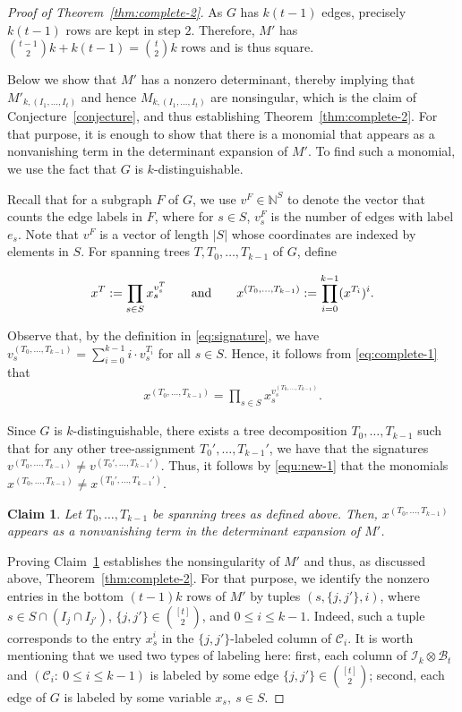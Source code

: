 \documentclass[11pt]{article}
\newtheorem{claim}[theorem]{Claim}
\begin{document}
\begin{proof}[Proof of Theorem~\ref{thm:complete-2}]
\noindent As $G$ has $k(t-1)$ edges, precisely $k(t-1)$ rows are kept in step $2$. Therefore, $M'$ has $\binom{t-1}{2}k + k(t-1) = \binom{t}{2}k$ rows and is thus square.

Below we show that $M'$ has a nonzero determinant, thereby implying that $M'_{k,(I_1,\ldots,I_t)}$ and hence $M_{k,(I_1,\ldots,I_t)}$ are nonsingular, which is the claim of Conjecture~\ref{conjecture}, and thus establishing Theorem~\ref{thm:complete-2}. For that purpose, it is enough to show that there is a monomial that appears as a nonvanishing term in the determinant expansion of $M'$. To find such a monomial, we use the fact that $G$ is $k$-distinguishable.

Recall that for a subgraph $F$ of $G$, we use $v^F\in\mathbb{N}^S$ to denote the vector that counts the  edge labels in $F$, where for $s\in S$, $v_s^F$ is the number of edges with label $e_s$. Note that $v^F$ is a vector of length $|S|$ whose coordinates are indexed by elements in $S$. For spanning trees $T,T_0,\ldots,T_{k-1}$ of $G$, define

\begin{align}
x^T := \prod_{s\in S}^{} x_s^{v^T_s}\text{\qquad and\qquad }x^{(T_0,\dots,T_{k-1})}:=\prod_{i=0}^{k-1} (x^{T_i})^i.
\label{eq:complete-1}
\end{align}

\noindent Observe that, by the definition in \eqref{eq:signature}, we have $v^{(T_0,\ldots,T_{k-1})}_s=\sum_{i=0}^{k-1} i\cdot v_s^{T_i}$ for all $s\in S$. Hence, it follows from \eqref{eq:complete-1} that
\begin{align}\label{equ:new-1}
  x^{(T_0,\dots,T_{k-1})}=  \prod_{s\in S}^{} x_s^{v^{(T_0,\dots,T_{k-1})}_s}.
\end{align}


Since $G$ is $k$-distinguishable, there exists a tree decomposition $T_0,\dots,T_{k-1}$ such that for any other tree-assignment $T_0',\dots,T_{k-1}'$, we have that the signatures $v^{(T_0,\dots,T_{k-1})}\neq v^{(T_0',\dots,T_{k-1}')}$.
Thus, it follows by \eqref{equ:new-1} that the monomials $x^{(T_0,\dots,T_{k-1})}\neq x^{(T_0',\dots,T_{k-1}')}$.

\begin{claim}\label{clm:new-1}
Let $T_0,\ldots,T_{k-1}$ be spanning trees as defined above. Then, $x^{(T_0,\dots,T_{k-1})}$ appears as a nonvanishing term in the determinant expansion of $M'$.
\end{claim}

Proving Claim~\ref{clm:new-1} establishes the nonsingularity of $M'$ and thus, as discussed above, Theorem~\ref{thm:complete-2}. For that purpose, we identify the nonzero entries in the bottom $(t-1)k$ rows of $M'$ by tuples $(s,\{j,j'\},i)$, where $s\in S\cap (I_j\cap I_{j'})$, $\{j,j'\}\in\binom{[t]}{2}$, and $0\le i\le k-1$. Indeed, such a tuple corresponds to the entry $x_s^i$ in the $\{j,j'\}$-labeled column of $\mathcal{C}_i$.
It is worth mentioning that we used two types of labeling here: first, each column of $\mathcal{I}_k\otimes \mathcal{B}_t$ and $(\mathcal{C}_i:~0\le i\le k-1)$ is labeled by some edge $\{j,j'\}\in\binom{[t]}{2}$; second, each edge of $G$ is labeled by some variable $x_s,~s\in S$.


\end{proof}
\end{document}
